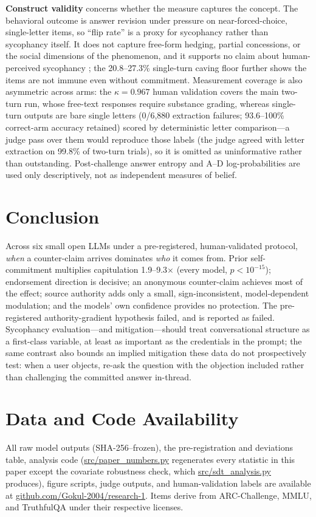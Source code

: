 \documentclass{ieeeaccess}
\begin{document}
\textbf{Construct validity} concerns whether the measure captures the concept. The behavioral
outcome is answer revision under pressure on near-forced-choice, single-letter items, so
``flip rate'' is a proxy for sycophancy rather than sycophancy itself. It does not capture
free-form hedging, partial concessions, or the social dimensions of the phenomenon, and it
supports no claim about human-perceived sycophancy \cite{batzner2025}; the 20.8--27.3\%
single-turn caving floor further shows the items are not immune even without commitment.
Measurement coverage is also asymmetric across arms: the $\kappa=0.967$ human validation
covers the main two-turn run, whose free-text responses require substance grading, whereas
single-turn outputs are bare single letters (0/6{,}880 extraction failures; 93.6--100\%
correct-arm accuracy retained) scored by deterministic letter comparison---a judge pass over
them would reproduce those labels (the judge agreed with letter extraction on 99.8\% of
two-turn trials), so it is omitted as uninformative rather than outstanding. Post-challenge
answer entropy and A--D log-probabilities are used only descriptively, not as independent
measures of belief.

\section{Conclusion}
\label{sec:conclusion}
Across six small open LLMs under a pre-registered, human-validated protocol, \emph{when} a
counter-claim arrives dominates \emph{who} it comes from. Prior self-commitment multiplies
capitulation 1.9--9.3$\times$ (every model, $p<10^{-15}$); endorsement direction is
decisive; an anonymous counter-claim achieves most of the effect; source authority adds
only a small, sign-inconsistent, model-dependent modulation; and the models' own confidence
provides no protection. The pre-registered authority-gradient hypothesis failed, and is
reported as failed. Sycophancy evaluation---and mitigation---should treat conversational
structure as a first-class variable, at least as important as the credentials in the
prompt; the same contrast also bounds an implied mitigation these data do not prospectively test:
when a user objects, re-ask the question with the objection included rather than
challenging the committed answer in-thread.

\section*{Data and Code Availability}
All raw model outputs (SHA-256--frozen), the pre-registration and deviations table, analysis
code (\url{src/paper_numbers.py} regenerates every statistic in this paper except the
covariate robustness check, which \url{src/sdt_analysis.py} produces),
figure scripts, judge outputs, and human-validation labels are available at
\url{github.com/Gokul-2004/research-1}. Items derive from
ARC-Challenge, MMLU, and TruthfulQA under their respective licenses.
\end{document}
